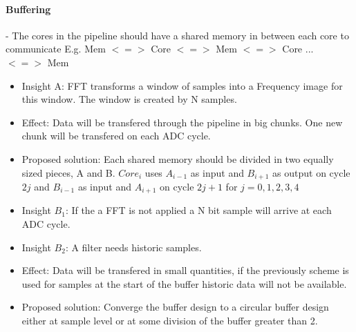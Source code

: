 \paragraph{Buffering}
- The cores in the pipeline should have a shared memory in between each core to
communicate
	E.g. Mem $<=>$ Core $<=>$ Mem $<=>$ Core ... $<=>$ Mem

\begin{itemize}
	\item Insight A: FFT transforms a window of samples into a Frequency image
for this window. The window is created by N samples.
	\item Effect: Data will be transfered through the pipeline in big chunks. One
new chunk will be transfered on each ADC cycle.
	\item Proposed solution: Each shared memory should be divided in two equally
sized pieces, A and B. $Core_i$ uses $A_{i-1}$ as input and $B_{i+1}$ as
output on cycle $2j$ and $B_{i-1}$ as input and $A_{i+1}$ on cycle $2j+1$ for
$j = 0,1,2,3,4$
\end{itemize}


\begin{itemize}
	\item Insight $B_1$: If the a FFT is not applied a N
	 bit sample
	will arrive at each ADC cycle.
	\item Insight $B_2$: A filter needs historic samples.
	\item Effect: Data will be transfered in small quantities, if the previously
scheme is used for samples at the start of the buffer historic data will not be
available.
	\item Proposed solution: Converge the buffer design to a circular buffer
design either at sample level or at some division of the buffer greater than 2.
\end{itemize}


